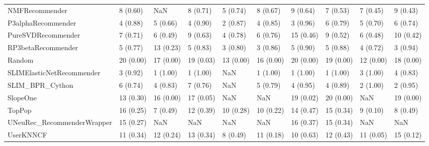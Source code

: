 \begin{tabular}{llllllllll}
                     NMFRecommender &                 8 (0.60) &         NaN &      8 (0.71) &     5 (0.74) &             8 (0.67) &            9 (0.64) &          7 (0.53) &           7 (0.45) &          9 (0.43) \\
                 P3alphaRecommender &                 4 (0.88) &    5 (0.66) &      4 (0.90) &     2 (0.87) &             4 (0.85) &            3 (0.96) &          6 (0.79) &           5 (0.70) &          6 (0.74) \\
                 PureSVDRecommender &                 7 (0.71) &    6 (0.49) &      9 (0.63) &     4 (0.78) &             6 (0.76) &           15 (0.46) &          9 (0.52) &           6 (0.48) &         10 (0.42) \\
                 RP3betaRecommender &                 5 (0.77) &   13 (0.23) &      5 (0.83) &     3 (0.80) &             3 (0.86) &            5 (0.90) &          5 (0.88) &           4 (0.72) &          3 (0.94) \\
                             Random &                20 (0.00) &   17 (0.00) &     19 (0.03) &    13 (0.00) &            16 (0.00) &           20 (0.00) &         19 (0.00) &          12 (0.00) &         18 (0.00) \\
          SLIMElasticNetRecommender &                 3 (0.92) &    1 (1.00) &      1 (1.00) &          NaN &             1 (1.00) &            1 (1.00) &          1 (1.00) &           3 (1.00) &          4 (0.83) \\
                    SLIM\_BPR\_Cython &                 6 (0.74) &    4 (0.83) &      7 (0.76) &          NaN &             5 (0.79) &            4 (0.95) &          4 (0.89) &           2 (1.00) &          2 (0.95) \\
                           SlopeOne &                13 (0.30) &   16 (0.00) &     17 (0.05) &          NaN &                  NaN &           19 (0.02) &         20 (0.00) &                NaN &         19 (0.00) \\
                             TopPop &                16 (0.25) &    7 (0.49) &     12 (0.39) &    10 (0.28) &            10 (0.22) &           14 (0.47) &         15 (0.34) &           9 (0.10) &          8 (0.49) \\
         UNeuRec\_RecommenderWrapper &                15 (0.27) &         NaN &           NaN &          NaN &                  NaN &           16 (0.37) &         15 (0.34) &                NaN &               NaN \\
                          UserKNNCF &                11 (0.34) &   12 (0.24) &     13 (0.34) &     8 (0.49) &            11 (0.18) &           10 (0.63) &         12 (0.43) &          11 (0.05) &         15 (0.12) \\
\bottomrule
\end{tabular}
